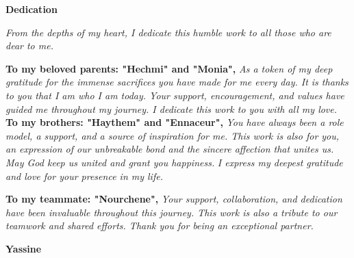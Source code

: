 \begin{center}
\doublespacing
\centering
\Large\textbf{Dedication} \\
\begin{center}
    \textit{From the depths of my heart, I dedicate this humble work to all those who are dear to me.}
\end{center}
\noindent \textbf{To my beloved parents: "Hechmi" and "Monia",}\newline
\textit{ As a token of my deep gratitude for the immense sacrifices you have made for me every day. It is thanks to you that I am who I am today. Your support, encouragement, and values have guided me throughout my journey. I dedicate this work to you with all my love.}\\
\noindent \textbf{To my brothers: "Haythem" and "Ennaceur",}\newline
\textit{ You have always been a role model, a support, and a source of inspiration for me. This work is also for you, an expression of our unbreakable bond and the sincere affection that unites us. May God keep us united and grant you happiness.}
\textit{ I express my deepest gratitude and love for your presence in my life.}

\vspace{0.2cm}
\noindent \textbf{To my teammate: "Nourchene",}\newline
\textit{ Your support, collaboration, and dedication have been invaluable throughout this journey. This work is also a tribute to our teamwork and shared efforts. Thank you for being an exceptional partner.}
\vspace{0.5cm}
    
    \textbf{Yassine}
\end{center}
